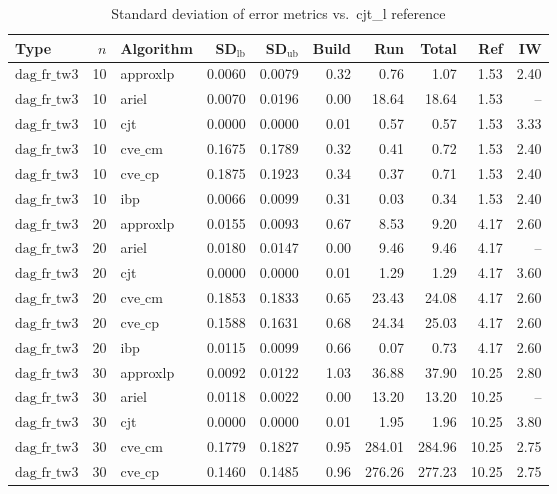 \begin{table}[ht]
\centering
\scriptsize
\caption{Standard deviation of error metrics vs.\ cjt_l reference}
\begin{tabular}{lrlrrrrrrr}
\toprule
Type & $n$ & Algorithm & SD$_{\text{lb}}$ & SD$_{\text{ub}}$ & Build & Run & Total & Ref & IW \\
\midrule
$\text{dag\_fr\_tw3}$ & 10 & approxlp & 0.0060 & 0.0079 & 0.32 & 0.76 & 1.07 & 1.53 & 2.40 \\
$\text{dag\_fr\_tw3}$ & 10 & ariel & 0.0070 & 0.0196 & 0.00 & 18.64 & 18.64 & 1.53 & -- \\
$\text{dag\_fr\_tw3}$ & 10 & cjt & 0.0000 & 0.0000 & 0.01 & 0.57 & 0.57 & 1.53 & 3.33 \\
$\text{dag\_fr\_tw3}$ & 10 & $\text{cve\_cm}$ & 0.1675 & 0.1789 & 0.32 & 0.41 & 0.72 & 1.53 & 2.40 \\
$\text{dag\_fr\_tw3}$ & 10 & $\text{cve\_cp}$ & 0.1875 & 0.1923 & 0.34 & 0.37 & 0.71 & 1.53 & 2.40 \\
$\text{dag\_fr\_tw3}$ & 10 & ibp & 0.0066 & 0.0099 & 0.31 & 0.03 & 0.34 & 1.53 & 2.40 \\
$\text{dag\_fr\_tw3}$ & 20 & approxlp & 0.0155 & 0.0093 & 0.67 & 8.53 & 9.20 & 4.17 & 2.60 \\
$\text{dag\_fr\_tw3}$ & 20 & ariel & 0.0180 & 0.0147 & 0.00 & 9.46 & 9.46 & 4.17 & -- \\
$\text{dag\_fr\_tw3}$ & 20 & cjt & 0.0000 & 0.0000 & 0.01 & 1.29 & 1.29 & 4.17 & 3.60 \\
$\text{dag\_fr\_tw3}$ & 20 & $\text{cve\_cm}$ & 0.1853 & 0.1833 & 0.65 & 23.43 & 24.08 & 4.17 & 2.60 \\
$\text{dag\_fr\_tw3}$ & 20 & $\text{cve\_cp}$ & 0.1588 & 0.1631 & 0.68 & 24.34 & 25.03 & 4.17 & 2.60 \\
$\text{dag\_fr\_tw3}$ & 20 & ibp & 0.0115 & 0.0099 & 0.66 & 0.07 & 0.73 & 4.17 & 2.60 \\
$\text{dag\_fr\_tw3}$ & 30 & approxlp & 0.0092 & 0.0122 & 1.03 & 36.88 & 37.90 & 10.25 & 2.80 \\
$\text{dag\_fr\_tw3}$ & 30 & ariel & 0.0118 & 0.0022 & 0.00 & 13.20 & 13.20 & 10.25 & -- \\
$\text{dag\_fr\_tw3}$ & 30 & cjt & 0.0000 & 0.0000 & 0.01 & 1.95 & 1.96 & 10.25 & 3.80 \\
$\text{dag\_fr\_tw3}$ & 30 & $\text{cve\_cm}$ & 0.1779 & 0.1827 & 0.95 & 284.01 & 284.96 & 10.25 & 2.75 \\
$\text{dag\_fr\_tw3}$ & 30 & $\text{cve\_cp}$ & 0.1460 & 0.1485 & 0.96 & 276.26 & 277.23 & 10.25 & 2.75 \\

\end{tabular}
\end{table}
